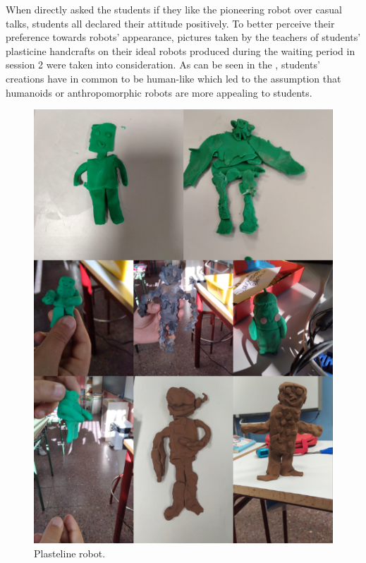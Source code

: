 \documentclass[english]{textolivre}
\begin{document}
When directly asked the students if they like the pioneering robot over casual talks, students all declared their attitude positively. To better perceive their preference towards robots’ appearance, pictures taken by the teachers of students’ plasticine handcrafts on their ideal robots produced during the waiting period in session 2 were taken into consideration. As can be seen in the , students’ creations have in common to be human-like which led to the assumption that humanoids or anthropomorphic robots are more appealing to students.

\begin{figure}[h!]
\centering
\begin{minipage}{.5\textwidth}
 \includegraphics[width=\textwidth]{Fig7.png}
 \caption{Plasteline robot.}
 \label{fig07}
\end{minipage}
\end{figure}
\end{document}
